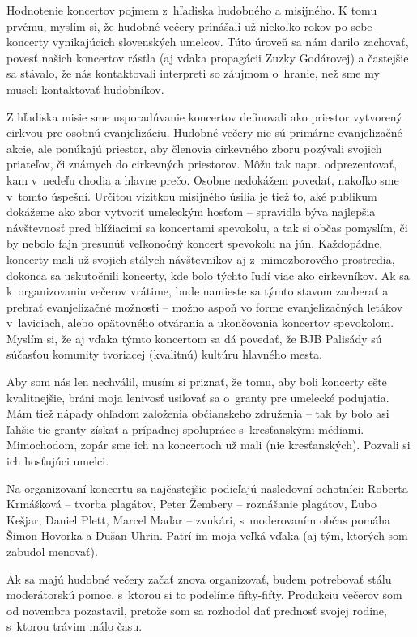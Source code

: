 Hodnotenie koncertov pojmem z~hľadiska hudobného a misijného. K tomu prvému, myslím si, že hudobné večery prinášali už niekoľko rokov po sebe koncerty vynikajúcich slovenských umelcov. Túto úroveň sa nám darilo zachovať, povesť našich koncertov rástla (aj vďaka propagácii Zuzky Godárovej) a častejšie sa stávalo, že nás kontaktovali interpreti so záujmom o~hranie, než sme my museli kontaktovať hudobníkov.

Z hľadiska misie sme usporadúvanie koncertov definovali ako priestor vytvorený cirkvou pre osobnú evanjelizáciu. Hudobné večery nie sú primárne evanjelizačné akcie, ale ponúkajú priestor, aby členovia cirkevného zboru pozývali svojich priateľov, či známych do cirkevných priestorov. Môžu tak napr. odprezentovať, kam v~nedeľu chodia a hlavne prečo. Osobne nedokážem povedať, nakoľko sme v~tomto úspešní. Určitou vizitkou misijného úsilia je tiež to, aké publikum dokážeme ako zbor vytvoriť umeleckým hosťom – spravidla býva najlepšia návštevnosť pred blížiacimi sa koncertami spevokolu, a tak si občas pomyslím, či by nebolo fajn presunúť veľkonočný koncert spevokolu na jún. Každopádne, koncerty mali už svojich stálych návštevníkov aj z~mimozborového prostredia, dokonca sa uskutočnili koncerty, kde bolo týchto ľudí viac ako cirkevníkov. Ak sa k~organizovaniu večerov vrátime, bude namieste sa týmto stavom zaoberať a prebrať evanjelizačné možnosti – možno aspoň vo forme evanjelizačných letákov v~laviciach, alebo opätovného otvárania a ukončovania koncertov spevokolom. Myslím si, že aj vďaka týmto koncertom sa dá povedať, že BJB Palisády sú súčasťou komunity tvoriacej (kvalitnú) kultúru hlavného mesta.

Aby som nás len nechválil, musím si priznať, že tomu, aby boli koncerty ešte kvalitnejšie, bráni moja lenivosť usilovať sa o~granty pre umelecké podujatia. Mám tiež nápady ohľadom založenia občianskeho združenia – tak by bolo asi ľahšie tie granty získať a prípadnej spolupráce s~kresťanskými médiami. Mimochodom, zopár sme ich na koncertoch už mali (nie kresťanských). Pozvali si ich hosťujúci umelci.

Na organizovaní koncertu sa najčastejšie podieľajú nasledovní ochotníci: Roberta Krmášková – tvorba plagátov, Peter Žembery – roznášanie plagátov, Ľubo Kešjar, Daniel Plett, Marcel Maďar – zvukári, s~moderovaním občas pomáha Šimon Hovorka a Dušan Uhrin. Patrí im moja veľká vďaka (aj tým, ktorých som zabudol menovať).

Ak sa majú hudobné večery začať znova organizovať, budem potrebovať stálu moderátorskú pomoc, s~ktorou si to podelíme fifty-fifty. Produkciu večerov som od novembra pozastavil, pretože som sa rozhodol dať prednosť svojej rodine, s~ktorou trávim málo času.


